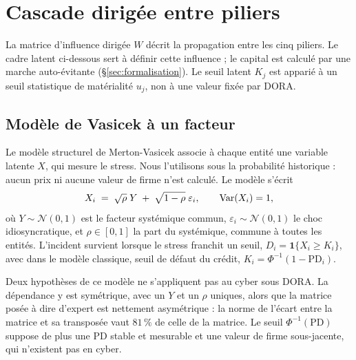 
\chapter{Cascade dirigée entre piliers}
\label{chap:cascade}

La matrice d'influence dirigée $W$ décrit la propagation entre les cinq piliers.
Le cadre latent ci-dessous sert à définir cette influence ; le capital est calculé par une marche
auto-évitante (\S\ref{sec:formalisation}). Le seuil latent $K_j$ est apparié à un seuil
statistique de matérialité $u_j$, non à une valeur fixée par DORA.

\section{Modèle de Vasicek à un facteur}

Le modèle structurel de Merton-Vasicek associe à chaque entité une variable latente $X$, qui
mesure le stress. Nous l'utilisons sous la probabilité historique : aucun prix ni aucune valeur de
firme n'est calculé. Le modèle s'écrit
\begin{equation}
X_i \;=\; \sqrt{\rho}\;Y \;+\; \sqrt{1-\rho}\;\varepsilon_i, \qquad \mathrm{Var}(X_i)=1,
\end{equation}
où $Y\sim\mathcal N(0,1)$ est le facteur systémique commun, $\varepsilon_i\sim\mathcal N(0,1)$ le
choc idiosyncratique, et $\rho\in[0,1]$ la part du systémique, commune à toutes les entités.
L'incident survient lorsque le stress franchit un seuil, $D_i=\mathbf 1\{X_i\ge K_i\}$, avec dans
le modèle classique, seuil de défaut du crédit, $K_i=\Phi^{-1}(1-\mathrm{PD}_i)$.

Deux hypothèses de ce modèle ne s'appliquent pas au cyber sous DORA. La dépendance y est
symétrique, avec un $Y$ et un $\rho$ uniques, alors que la matrice posée à dire d'expert est
nettement asymétrique : la norme de l'écart entre la matrice et sa transposée vaut $81\,\%$ de celle de la matrice. Le seuil $\Phi^{-1}(\mathrm{PD})$ suppose de plus une PD stable et mesurable et
une valeur de firme sous-jacente, qui n'existent pas en cyber.

